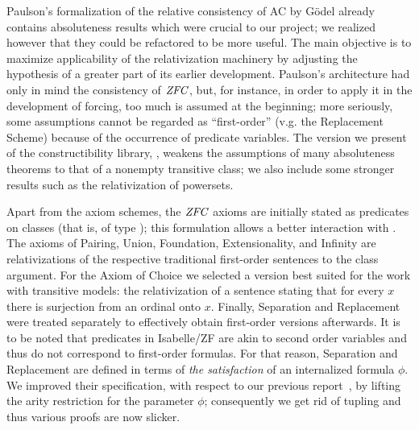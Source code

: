 Paulson's formalization \cite{paulson_2003} of the relative
consistency of AC by Gödel \cite{godel-L} already contains
absoluteness results which were crucial to our project; we realized
however that they could be refactored to be more useful. The main
objective is to maximize applicability of the relativization machinery
by adjusting the hypothesis of a greater part of its earlier
development. Paulson's architecture had only in mind the consistency
of $\mathit{ZFC}$, but, for instance, in order to apply it in the development
of forcing, too much is assumed at the beginning; more seriously, some
assumptions cannot be regarded as ``first-order'' (v.g. the
Replacement Scheme) because of the occurrence of predicate variables.
The version we present of the constructibility library,
, weakens the assumptions of many
absoluteness theorems to that of a nonempty transitive class; we also
include some stronger results such as the relativization of powersets.

Apart from the axiom schemes, the $\mathit{ZFC}$ axioms are initially stated
as predicates on classes (that is, of type
); this formulation
allows a better interaction with .  The axioms
of Pairing, Union, Foundation, Extensionality, and Infinity are
relativizations of the respective traditional first-order sentences to
the class argument. For the Axiom of Choice we selected a version best
suited for the work with transitive models: the relativization of a
sentence stating that for every $x$ there is surjection from an
ordinal onto $x$. Finally, Separation and Replacement were treated
separately to effectively obtain first-order versions afterwards. It
is to be noted that predicates in Isabelle/ZF are akin to second order
variables and thus do not correspond to first-order formulas.
For that reason, Separation and Replacement are defined in terms of
\emph{the satisfaction} of an internalized formula $\phi$.  We improved their
specification, with respect to our previous
report~\cite{2019arXiv190103313G}, by lifting the arity restriction
for the parameter $\phi$; consequently we get rid of tupling and thus
various proofs are now slicker.


